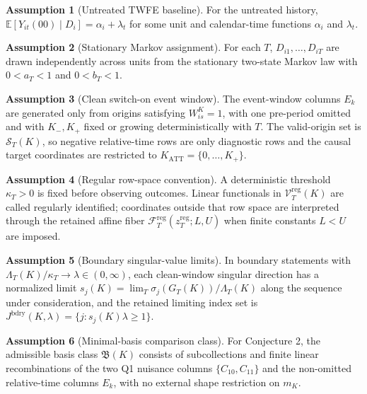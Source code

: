 \documentclass[11pt]{article}
\newcommand{\E}{\mathbb{E}}
\theoremstyle{definition}
\newtheorem{assumption}{Assumption}
\theoremstyle{plain}
\theoremstyle{remark}
\begin{document}
\begin{assumption}[Untreated TWFE baseline]\label{ass:untreated-twfe}
For the untreated history, \(\E[Y_{it}(00)\mid D_i]=\alpha_i+\lambda_t\) for some unit and calendar-time functions \(\alpha_i\) and \(\lambda_t\).
\end{assumption}

\begin{assumption}[Stationary Markov assignment]\label{ass:stationary-markov}
For each \(T\), \(D_{i1},\ldots,D_{iT}\) are drawn independently across units from the stationary two-state Markov law with \(0<a_T<1\) and \(0<b_T<1\).
\end{assumption}

\begin{assumption}[Clean switch-on event window]\label{ass:clean-window}
The event-window columns \(E_k\) are generated only from origins satisfying \(W_{is}^K=1\), with one pre-period omitted and with \(K_-,K_+\) fixed or growing deterministically with \(T\).
The valid-origin set is \(\mathcal S_T(K)\), so negative relative-time rows are only diagnostic rows and the causal target coordinates are restricted to \(K_{\mathrm{ATT}}=\{0,\ldots,K_+\}\).
\end{assumption}

\begin{assumption}[Regular row-space convention]\label{ass:regular-row}
A deterministic threshold \(\kappa_T>0\) is fixed before observing outcomes. Linear functionals in \(\mathcal V_T^{\mathrm{reg}}(K)\) are called regularly identified; coordinates outside that row space are interpreted through the retained affine fiber \(\mathcal F_T^{\mathrm{reg}}(z_T^{\mathrm{reg}};L,U)\) when finite constants \(L<U\) are imposed.
\end{assumption}

\begin{assumption}[Boundary singular-value limits]\label{ass:boundary-limits}
In boundary statements with \(\Lambda_T(K)/\kappa_T\to\lambda\in(0,\infty)\), each clean-window singular direction has a normalized limit \(s_j(K)=\lim_T \sigma_j(G_T(K))/\Lambda_T(K)\) along the sequence under consideration, and the retained limiting index set is \(J^{\mathrm{bdry}}(K,\lambda)=\{j:s_j(K)\lambda\ge1\}\).
\end{assumption}

\begin{assumption}[Minimal-basis comparison class]\label{ass:minimal-class}
For Conjecture 2, the admissible basis class \(\mathfrak B(K)\) consists of subcollections and finite linear recombinations of the two Q1 nuisance columns \(\{C_{10},C_{11}\}\) and the non-omitted relative-time columns \(E_k\), with no external shape restriction on \(m_K\).
\end{assumption}
\end{document}
